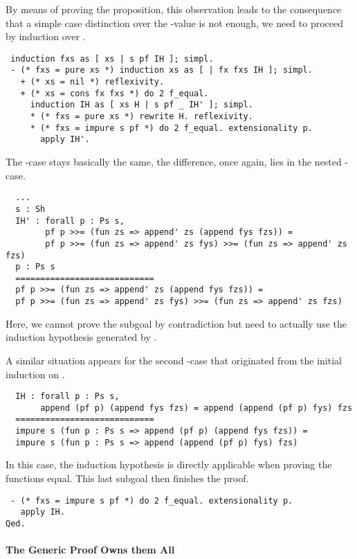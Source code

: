 By means of proving the proposition, this observation leads to the
consequence that a simple case distinction over the -value
 is not enough, we need to proceed by induction over
.

\begin{verbatim}
 induction fxs as [ xs | s pf IH ]; simpl.
 - (* fxs = pure xs *) induction xs as [ | fx fxs IH ]; simpl.
   + (* xs = nil *) reflexivity.
   + (* xs = cons fx fxs *) do 2 f_equal.
     induction IH as [ xs H | s pf _ IH' ]; simpl.
     * (* fxs = pure xs *) rewrite H. reflexivity.
     * (* fxs = impure s pf *) do 2 f_equal. extensionality p.
       apply IH'.
\end{verbatim}

The -case stays basically the same, the difference, once
again, lies in the nested -case.

\begin{verbatim}
  ...
  s : Sh
  IH' : forall p : Ps s,
        pf p >>= (fun zs => append' zs (append fys fzs)) =
        pf p >>= (fun zs => append' zs fys) >>= (fun zs => append' zs fzs)
  p : Ps s
  ============================
  pf p >>= (fun zs => append' zs (append fys fzs)) =
  pf p >>= (fun zs => append' zs fys) >>= (fun zs => append' zs fzs)
\end{verbatim}

Here, we cannot prove the subgoal by contradiction but need to
actually use the induction hypothesis  generated by
.

A similar situation appears for the second -case that
originated from the initial induction on .
\begin{verbatim}
  IH : forall p : Ps s,
       append (pf p) (append fys fzs) = append (append (pf p) fys) fzs
  ============================
  impure s (fun p : Ps s => append (pf p) (append fys fzs)) =
  impure s (fun p : Ps s => append (append (pf p) fys) fzs)
\end{verbatim}

In this case, the induction hypothesis is directly applicable when
proving the functions equal.
This last subgoal then finishes the proof.

\begin{verbatim}
 - (* fxs = impure s pf *) do 2 f_equal. extensionality p.
   apply IH.
Qed.
\end{verbatim}

\paragraph{The Generic Proof Owns them All}


